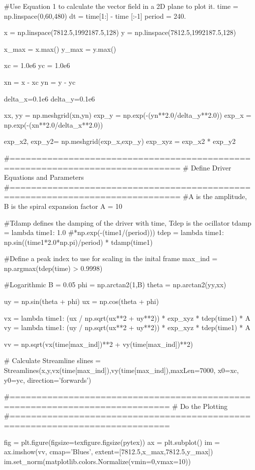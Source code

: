 \begin{pycode}[chapter6]

#Use Equation 1 to calculate the vector field in a 2D plane to plot it.
time = np.linspace(0,60,480)
dt = time[1:] - time [:-1]
period = 240.

x = np.linspace(7812.5,1992187.5,128)
y = np.linspace(7812.5,1992187.5,128)

x_max = x.max()
y_max = y.max()

xc = 1.0e6
yc = 1.0e6

xn = x - xc
yn = y - yc

delta_x=0.1e6
delta_y=0.1e6

xx, yy = np.meshgrid(xn,yn)
exp_y = np.exp(-(yn**2.0/delta_y**2.0))
exp_x = np.exp(-(xn**2.0/delta_x**2.0))

exp_x2, exp_y2= np.meshgrid(exp_x,exp_y)
exp_xyz = exp_x2 * exp_y2


#==============================================================================
# Define Driver Equations and Parameters
#==============================================================================
#A is the amplitude, B is the spiral expansion factor
A = 10

#Tdamp defines the damping of the driver with time, Tdep is the ocillator
tdamp = lambda time1: 1.0 #*np.exp(-(time1/(period)))
tdep = lambda time1: np.sin((time1*2.0*np.pi)/period) * tdamp(time1)

#Define a peak index to use for scaling in the inital frame
max_ind = np.argmax(tdep(time) > 0.9998)

#Logarithmic
B = 0.05
phi = np.arctan2(1,B)
theta = np.arctan2(yy,xx)

uy = np.sin(theta + phi)
ux =  np.cos(theta + phi)

vx = lambda time1: (ux / np.sqrt(ux**2 + uy**2)) * exp_xyz * tdep(time1) * A
vy = lambda time1: (uy / np.sqrt(ux**2 + uy**2)) * exp_xyz * tdep(time1) * A

vv = np.sqrt(vx(time[max_ind])**2 + vy(time[max_ind])**2)

# Calculate Streamline
slines = Streamlines(x,y,vx(time[max_ind]),vy(time[max_ind]),maxLen=7000,
x0=xc, y0=yc, direction='forwards')

#============================================================================
# Do the Plotting
#============================================================================

fig = plt.figure(figsize=texfigure.figsize(pytex))
ax = plt.subplot()
im = ax.imshow(vv, cmap='Blues', extent=[7812.5,x_max,7812.5,y_max])
im.set_norm(matplotlib.colors.Normalize(vmin=0,vmax=10))


\end{pycode}
